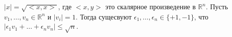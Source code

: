 $|x| = \sqrt{{<}x, x{>}}$, где ${<}x, y{>}$ это скалярное произведение в $\mathbb{R}^n$. Пусть $v_1, \dotsc, v_n \in
\mathbb{R}^n$ и $|v_i| = 1$. Тогда сущесвуют $\epsilon_1, \dotsc, \epsilon_n \in \{+1, -1\}$, что $|\epsilon_1v_1 + \dotsc +
\epsilon_nv_n| \leq \sqrt{n}$. 
